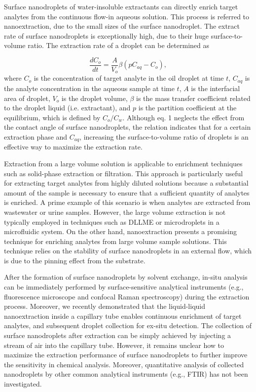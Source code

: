 \documentclass[a4paper,fleqn]{cas-dc}
\begin{document}
\begin{sloppypar}
Surface nanodroplets of water-insoluble extractants can directly enrich target analytes from the continuous flow-in aqueous solution. This process is referred to nanoextraction,\cite{li2019functional} due to the small sizes of the surface nanodroplet.  The extract rate of surface nanodroplets is exceptionally high, due to their huge surface-to-volume ratio. The extraction rate of a droplet can be determined as\cite{wei2022interfacial,jeannot1996solvent}

\begin{equation}
\frac{dC_o}{dt}=\frac{A}{V_o}{\beta}({p}{C_{aq}}-C_o),
\label{e0}
\end{equation}
where $C_o$ is the concentration of target analyte in the oil droplet at time $t$, $C_{aq}$ is the analyte concentration in the aqueous sample at time $t$, $A$ is the interfacial area of droplet, $V_o$ is the droplet volume, $\beta$ is the mass transfer coefficient related to the droplet liquid (i.e. extractant), and $p$ is the partition coefficient at the equilibrium, which is defined by ${C_{o}}/{C_w}$. Although eq. 1 neglects the effect from the contact angle of surface nanodroplets, the relation indicates that for a certain extraction phase and $C_{aq}$, increasing the surface-to-volume ratio of droplets is an effective way to maximize the extraction rate.    
 

Extraction from a large volume solution is applicable to enrichment techniques such as solid-phase extraction or filtration\cite{schulze2017assessment,enamorado2015levels}. This approach is particularly useful for extracting target analytes from highly diluted solutions because a substantial amount of the sample is necessary to ensure that a sufficient quantity of analytes is enriched. A prime example of this scenario is when analytes are extracted from wastewater or urine samples. However, the large volume extraction is not typically employed in techniques such as DLLME or microdroplets in a microfluidic system. On the other hand, nanoextraction presents a promising technique for enriching analytes from large volume sample solutions. This technique relies on the stability of surface nanodroplets in an external flow, which is due to the pinning effect from the substrate.

 
After the formation of surface nanodroplets by solvent exchange, in-situ analysis can be immediately performed by surface-sensitive analytical instruments (e.g., fluorescence microscope and confocal Raman spectroscopy) during the extraction process.\cite{li2019functional,yu2016large} Moreover, we recently demonstrated that the liquid-liquid nanoextraction inside a capillary tube enables continuous enrichment of target analytes, and subsequent droplet collection for ex-situ detection.\cite{li2022surface} The collection of surface nanodroplets after extraction can be simply achieved by injecting a stream of air into the capillary tube. However, it remains unclear how to maximize the extraction performance of surface nanodroplets to further improve the sensitivity in chemical analysis. Moreover, quantitative analysis of collected nanodroplets by other common analytical instruments (e.g., FTIR) has not been investigated. 



\end{sloppypar}
\end{document}
